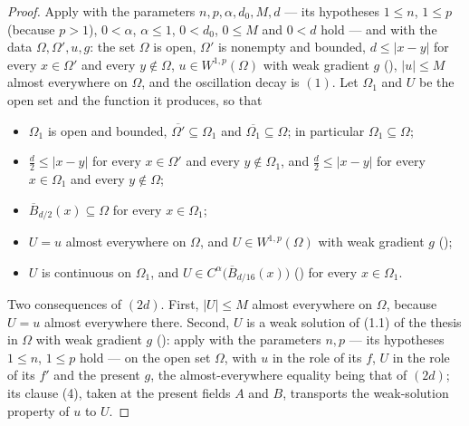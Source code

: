 \begin{proof}
Apply  with the parameters
$n,p,\alpha,d_0,M,d$ --- its hypotheses $1\le n$, $1\le p$ (because $p>1$),
$0<\alpha$, $\alpha\le1$, $0<d_0$, $0\le M$ and $0<d$ hold --- and with the
data $\Omega,\Omega',u,g$: the set $\Omega$ is open, $\Omega'$ is nonempty and
bounded, $d\le|x-y|$ for every $x\in\Omega'$ and every $y\notin\Omega$,
$u\in W^{1,p}(\Omega)$ with weak gradient $g$ (),
$|u|\le M$ almost everywhere on $\Omega$, and the oscillation decay is $(1)$.
Let $\Omega_1$ and $U$ be the open set and the function it produces, so that
\begin{itemize}
\item[(2a)] $\Omega_1$ is open and bounded,
  $\overline{\Omega'}\subseteq\Omega_1$ and
  $\overline{\Omega_1}\subseteq\Omega$; in particular
  $\Omega_1\subseteq\Omega$;
\item[(2b)] $\frac d2\le|x-y|$ for every $x\in\Omega'$ and every
  $y\notin\Omega_1$, and $\frac d2\le|x-y|$ for every $x\in\Omega_1$ and every
  $y\notin\Omega$;
\item[(2c)] $\overline B_{d/2}(x)\subseteq\Omega$ for every $x\in\Omega_1$;
\item[(2d)] $U=u$ almost everywhere on $\Omega$, and $U\in W^{1,p}(\Omega)$
  with weak gradient $g$ ();
\item[(2e)] $U$ is continuous on $\Omega_1$, and
  $U\in C^\alpha\bigl(\overline B_{d/16}(x)\bigr)$ () for
  every $x\in\Omega_1$.
\end{itemize}

Two consequences of $(2d)$.  First, $|U|\le M$ almost everywhere on $\Omega$,
because $U=u$ almost everywhere there.  Second, $U$ is a weak solution of
(1.1) of the thesis in $\Omega$ with weak gradient $g$ ():
apply  with the parameters $n,p$ --- its
hypotheses $1\le n$, $1\le p$ hold --- on the open set $\Omega$, with $u$ in the
role of its $f$, $U$ in the role of its $f'$ and the present $g$, the
almost-everywhere equality being that of $(2d)$; its clause (4), taken at the
present fields $A$ and $B$, transports the weak-solution property of $u$ to $U$.


\end{proof}
